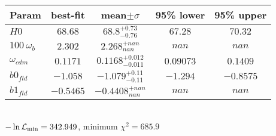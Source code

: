 \begin{tabular}{|l|c|c|c|c|} 
 \hline 
Param & best-fit & mean$\pm\sigma$ & 95\% lower & 95\% upper \\ \hline 
$H0$ &$68.68$ & $68.8_{-0.76}^{+0.73}$ & $67.28$ & $70.32$ \\ 
$100~\omega_{b }$ &$2.302$ & $2.268_{nan}^{+nan}$ & $nan$ & $nan$ \\ 
$\omega_{cdm }$ &$0.1171$ & $0.1168_{-0.011}^{+0.012}$ & $0.09073$ & $0.1409$ \\ 
$b0_{fld }$ &$-1.058$ & $-1.079_{-0.11}^{+0.11}$ & $-1.294$ & $-0.8575$ \\ 
$b1_{fld }$ &$-0.5465$ & $-0.4408_{nan}^{+nan}$ & $nan$ & $nan$ \\ 
\hline 
 \end{tabular} \\ 
$-\ln{\cal L}_\mathrm{min} =342.949$, minimum $\chi^2=685.9$ \\ 
